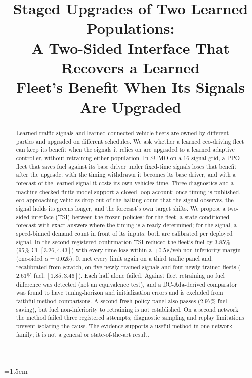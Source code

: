 
\usepackage{multirow}
\emergencystretch=1.5em



\title{Staged Upgrades of Two Learned Populations:\\
A Two-Sided Interface That Recovers a Learned\\
Fleet's Benefit When Its Signals Are Upgraded}

\author{
}

\maketitle

\begin{abstract}
Learned traffic signals and learned connected-vehicle fleets are owned by different parties and upgraded on different schedules. We ask
whether a learned eco-driving fleet can keep its benefit when the signals it relies on are upgraded to a learned adaptive controller,
without retraining either population. In SUMO on a 16-signal grid, a PPO fleet that saves fuel against its base driver under fixed-time
signals loses that benefit after the upgrade: with the timing withdrawn it becomes its base driver, and with a forecast of the learned
signal it costs its own vehicles time. Three diagnostics and a machine-checked finite model support a closed-loop account: once timing is
published, eco-approaching vehicles drop out of the halting count that the signal observes, the signal holds its greens longer, and the
forecast's own target shifts. We propose a two-sided interface (TSI) between the frozen policies: for the fleet, a state-conditioned
forecast with exact answers where the timing is already determined; for the signal, a speed-binned demand count in front of its inputs;
both are calibrated per deployed signal. In the second registered confirmation TSI reduced the fleet's fuel by $3.85\%$ (95\% CI
$[3.26, 4.43]$) with every time loss within a $+0.5$\,s/veh non-inferiority margin (one-sided $\alpha=0.025$). It met every limit again on
a third traffic panel and, recalibrated from scratch, on five newly trained signals and four newly trained fleets ($2.61\%$ fuel,
$[1.85, 3.46]$). Each half alone failed. Against fleet retraining no fuel difference was detected (not an equivalence test), and a
DC-Ada-derived comparator was found to have tuning-horizon and initialization errors and is excluded from faithful-method comparisons. A second fresh-policy panel also passes ($2.97\%$ fuel saving), but fuel non-inferiority to retraining is not established. On a second network the method failed three registered attempts; diagnostic sampling and replay limitations prevent isolating the cause. The evidence supports a useful method in one network family; it is not a general or
state-of-the-art result.
\end{abstract}

